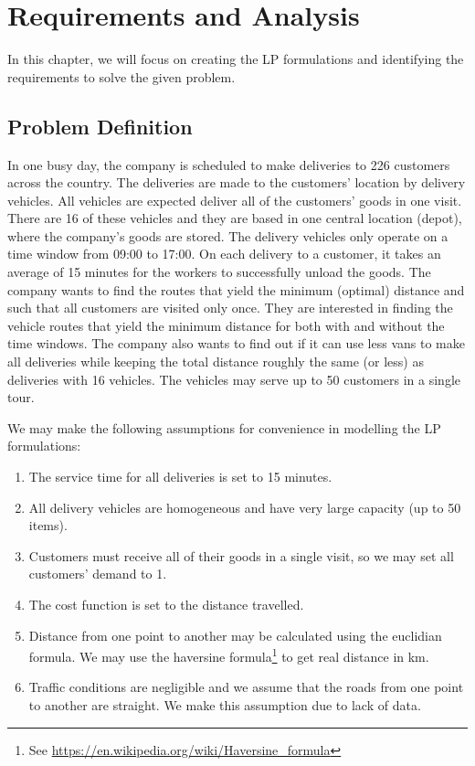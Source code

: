 \chapter{Requirements and Analysis}
In this chapter, we will focus on creating the LP formulations and identifying the requirements to solve the given problem.

\section{Problem Definition}
In one busy day, the company is scheduled to make deliveries to 226 customers across the country. The deliveries are made to the customers' location by delivery vehicles. All vehicles are
expected deliver all of the customers' goods in one visit.  There are 16 of these vehicles and they are based in
one central location (depot), where the company's goods are stored. The delivery vehicles only operate on
a time window from 09:00 to 17:00. On each delivery to a customer, it takes an average of 15 minutes for the workers to successfully unload the goods.
The company wants to find the routes that yield the minimum (optimal) distance and such that all customers are visited only once. They are interested
in finding the vehicle routes that yield the minimum distance for both with and without the time windows.
The company also wants to find out if it can use less vans to make all deliveries while
keeping the total distance roughly the same (or less) as deliveries with 16 vehicles. The vehicles may serve up to 50 customers in a single tour.

We may make the following assumptions for convenience in modelling the LP formulations:
\begin{enumerate}
\item The service time for all deliveries is set to 15 minutes.
\item All delivery vehicles are homogeneous and have very large capacity (up to 50 items).
\item Customers must receive all of their goods in a single visit, so we may set all customers' demand to 1.
\item The cost function is set to the distance travelled.
\item Distance from one point to another may be calculated using the euclidian formula. We may use the haversine
formula\footnote{See \url{https://en.wikipedia.org/wiki/Haversine_formula}} to get real distance in km.
\item Traffic conditions are negligible and we assume that the roads from one point to another are straight. We make this
assumption due to lack of data.
\end{enumerate}

